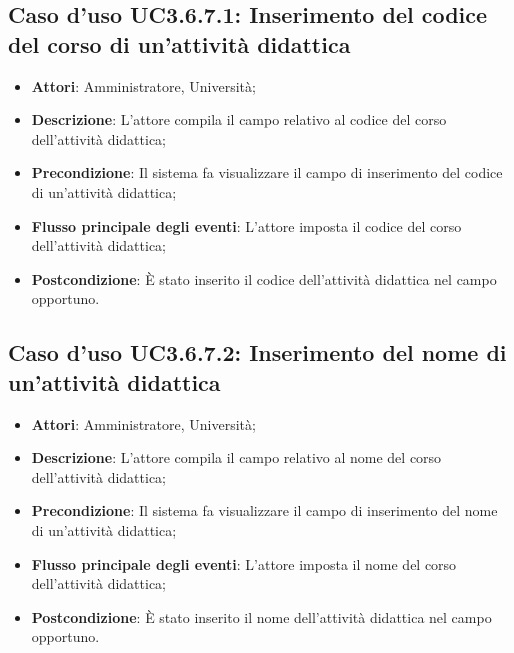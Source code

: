 \subsection{Caso d'uso \texorpdfstring{UC3.6.7.1}{UC3.6.7.1}: Inserimento del codice del corso di un'attività didattica}
\begin{itemize}
\item \textbf{Attori}: Amministratore, Università;
\item \textbf{Descrizione}: L'attore compila il campo relativo al codice del corso dell'attività didattica;

\item \textbf{Precondizione}: Il sistema fa visualizzare il campo di inserimento del codice di un'attività didattica;

\item \textbf{Flusso principale degli eventi}: L'attore imposta il codice del corso dell'attività didattica;

\item \textbf{Postcondizione}: È stato inserito il codice dell'attività didattica nel campo opportuno.

\end{itemize}
\subsection{Caso d'uso \texorpdfstring{UC3.6.7.2}{UC3.6.7.2}: Inserimento del nome di un’attività didattica}
\begin{itemize}
\item \textbf{Attori}: Amministratore, Università;
\item \textbf{Descrizione}: L'attore compila il campo relativo al nome del corso dell'attività didattica;

\item \textbf{Precondizione}: Il sistema fa visualizzare il campo di inserimento del nome di un'attività didattica;

\item \textbf{Flusso principale degli eventi}: L'attore imposta il nome del corso dell'attività didattica;

\item \textbf{Postcondizione}: È stato inserito il nome dell'attività didattica nel campo opportuno.
\end{itemize}
